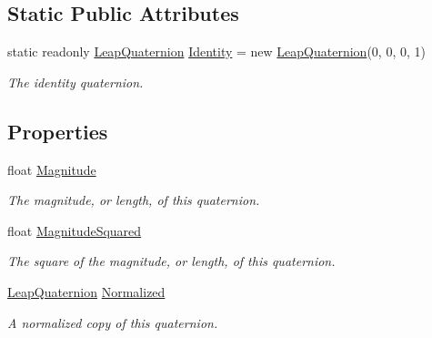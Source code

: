 \subsection*{Static Public Attributes}
\begin{DoxyCompactItemize}
\item 
static readonly \mbox{\hyperlink{struct_leap_1_1_leap_quaternion}{Leap\+Quaternion}} \mbox{\hyperlink{struct_leap_1_1_leap_quaternion_aa69693c6f2fd5545034b9c1c0af286b6}{Identity}} = new \mbox{\hyperlink{struct_leap_1_1_leap_quaternion}{Leap\+Quaternion}}(0, 0, 0, 1)
\begin{DoxyCompactList}\small\item\em The identity quaternion. \end{DoxyCompactList}\end{DoxyCompactItemize}
\subsection*{Properties}
\begin{DoxyCompactItemize}
\item 
float \mbox{\hyperlink{struct_leap_1_1_leap_quaternion_acd8798fff0933b8daceb61162257c0e1}{Magnitude}}
\begin{DoxyCompactList}\small\item\em The magnitude, or length, of this quaternion. \end{DoxyCompactList}\item 
float \mbox{\hyperlink{struct_leap_1_1_leap_quaternion_a1bae32bdd879d243ef609e86a980e49a}{Magnitude\+Squared}}
\begin{DoxyCompactList}\small\item\em The square of the magnitude, or length, of this quaternion. \end{DoxyCompactList}\item 
\mbox{\hyperlink{struct_leap_1_1_leap_quaternion}{Leap\+Quaternion}} \mbox{\hyperlink{struct_leap_1_1_leap_quaternion_a3d8b362ae5fc430450ea56146f08cce2}{Normalized}}
\begin{DoxyCompactList}\small\item\em A normalized copy of this quaternion. \end{DoxyCompactList}\end{DoxyCompactItemize}


